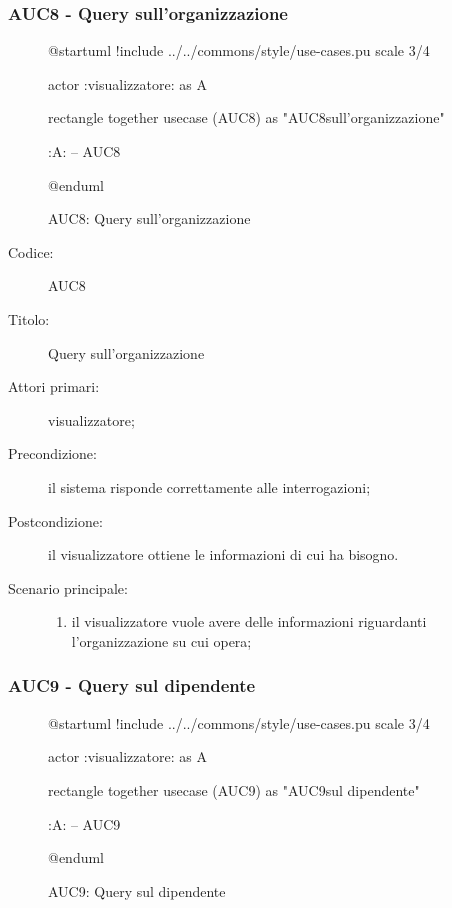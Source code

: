 \documentclass[casi-duso]{subfiles}
\begin{document}
\subsubsection{AUC8 - Query sull'organizzazione}%
\label{subsub:AUC8}

\begin{figure}[h!]
  \centering
  \begin{plantuml}
  @startuml
  !include ../../commons/style/use-cases.pu
  scale 3/4

  actor :visualizzatore: as A

  rectangle {
    together {
      usecase (AUC8) as "AUC8\nQuery sull'organizzazione"
    }
  }

  :A: -- AUC8

  @enduml
  \end{plantuml}
  \caption{AUC8: Query sull'organizzazione}
  \label{fig:auc8}
\end{figure}

\begin{description}
  \item[Codice:] AUC8
  \item[Titolo:] Query sull'organizzazione
  \item[Attori primari:] visualizzatore;
  \item[Precondizione:] il sistema risponde correttamente alle interrogazioni;
  \item[Postcondizione:] il visualizzatore ottiene le informazioni di cui ha bisogno.
  \item[Scenario principale:]
  \begin{enumerate}
    \item il visualizzatore vuole avere delle informazioni riguardanti l'organizzazione su cui opera;
  \end{enumerate}
\end{description}

\subsubsection{AUC9 - Query sul dipendente}%
\label{subsub:AUC9}

\begin{figure}[h!]
  \centering
  \begin{plantuml}
  @startuml
  !include ../../commons/style/use-cases.pu
  scale 3/4

  actor :visualizzatore: as A

  rectangle {
    together {
      usecase (AUC9) as "AUC9\nQuery sul dipendente"
    }
  }

  :A: -- AUC9

  @enduml
  \end{plantuml}
  \caption{AUC9: Query sul dipendente}
  \label{fig:auc9}
\end{figure}
\end{document}
